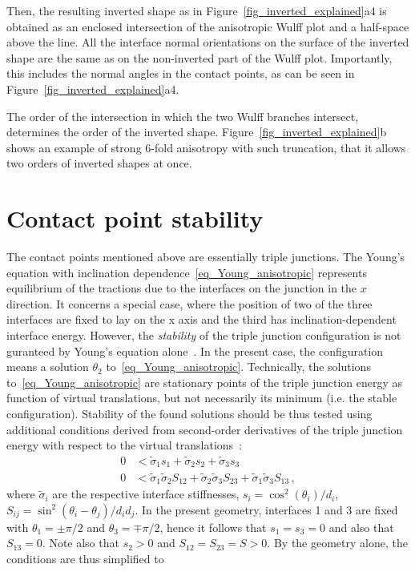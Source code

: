 Then, the resulting inverted shape as in Figure~\ref{fig_inverted_explained}a4 is obtained as an enclosed intersection of the anisotropic Wulff plot and a half-space above the line. All the interface normal orientations on the surface of the inverted shape are the same as on the non-inverted part of the Wulff plot. Importantly, this includes the normal angles in the contact points, as can be seen in Figure~\ref{fig_inverted_explained}a4.

The order of the intersection in which the two Wulff branches intersect, determines the order of the inverted shape. Figure~\ref{fig_inverted_explained}b shows an example of strong 6-fold anisotropy with such truncation, that it allows two orders of inverted shapes at once.


\section{Contact point stability}
The contact points mentioned above are essentially triple junctions. The Young's equation with inclination dependence~\eqref{eq_Young_anisotropic} represents equilibrium of the tractions due to the interfaces on the junction in the $x$ direction. It concerns
a special case, where the position of two of the three interfaces are fixed to lay on the x axis and the third has inclination-dependent interface energy. However, the \textit{stability} of the triple junction configuration is not guranteed by Young's equation alone~\cite{Marks2012}. In the present case, the configuration means a solution $\theta_2$ to~\eqref{eq_Young_anisotropic}. Technically, the solutions to~\eqref{eq_Young_anisotropic} are stationary points of the triple junction energy as function of virtual translations, but not necessarily its minimum (i.e. the stable configuration). Stability of the found solutions should be thus tested using additional conditions derived from second-order derivatives of the triple junction energy with respect to the virtual translations~\cite{Marks2012}:
\begin{align} 
	0 &< \tilde{\sigma}_1 s_1 + \tilde{\sigma}_2 s_2 + \tilde{\sigma}_3 s_3 \\
	0 &< \tilde{\sigma}_1\tilde{\sigma}_2 S_{12} + \tilde{\sigma}_2\tilde{\sigma}_3 S_{23} + \tilde{\sigma}_1\tilde{\sigma}_3 S_{13} \,,
\end{align}
where $\tilde{\sigma}_i$ are the respective interface stiffnesses, $s_i = \cos^2(\theta_i)/d_i$, $S_{ij} = \sin^2(\theta_i-\theta_j)/d_i d_j$. In the present geometry, interfaces 1 and 3 are fixed with $\theta_1=\pm\pi/2$ and $\theta_3=\mp\pi/2$, hence it follows that $s_1=s_3=0$ and also that $S_{13}=0$. Note also that $s_2>0$ and $S_{12}=S_{23}=S>0$. By the geometry alone, the conditions are thus simplified to
